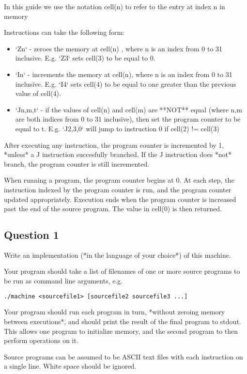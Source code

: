 \documentclass[12pt,a4paper,titlepage]{article}
\begin{document}
In this guide we use the notation cell(n) to refer to the entry at index n in memory

Instructions can take the following form:
\begin{itemize}
	\item `Zn`      - zeroes the memory at cell(n) , where n is an index from 0 to 31 inclusive. 
		E.g. `Z3` sets cell(3) to be equal to 0.
	\item `In`      - increments the memory at cell(n), where n is an index from 0 to 31 inclusive. 
		E.g. `I4` sets cell(4) to be equal to one greater than the previous value of cell(4).
	\item `Jn,m,t`  - if the values of cell(n) and cell(m) are **NOT** equal 
		(where n,m are both indices from 0 to 31 inclusive),
		then set the program counter to be equal to t. E.g. `J2,3,0` 
		will jump to instruction 0 if cell(2) != cell(3)
\end{itemize}

After executing any instruction, the program counter is incremented by 1, 
*unless* a J instruction succesfully branched. If the J instruction does *not* branch, 
the program counter is still incremented.

When running a program, the program counter begins at 0. At each step, 
the instruction indexed by the program counter is run, and the program counter updated appropriately. 
Execution ends when the program counter is increased past the end of the source program. 
The value in cell(0) is then returned.

\subsection{Question 1}
Write an implementation (*in the language of your choice*) of this machine.

Your program should take a list of filenames of one or more source programs to be 
run as command line arguments, e.g.

\begin{verbatim}
./machine <sourcefile1> [sourcefile2 sourcefile3 ...]
\end{verbatim}

Your program should run each program in turn, 
*without zeroing memory between executions*, and should print the result of the final program to stdout.
This allows one program to initialize memory, and the second program to then perform operations on it.

Source programs can be assumed to be ASCII text files with each instruction on a single line. 
White space should be ignored.
\end{document}
